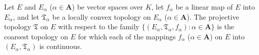 Let $E$ and $E_\alpha$ ($\alpha \in \mathbf{A}$) be vector spaces over $K$, let $f_\alpha$ be a linear map of $E$ into $E_\alpha$, and let $\mathfrak{T}_\alpha$ be a locally convex topology on $E_\alpha$ ($\alpha \in \mathbf{A}$). The projective topology $\mathfrak{T}$ on $E$ with respect to the family $\{(E_\alpha, \mathfrak{T}_\alpha, f_\alpha): \alpha \in \mathbf{A}\}$ is the coarsest topology on $E$ for which each of the mappings $f_\alpha$ ($\alpha \in \mathbf{A}$) on $E$ into $(E_\alpha, \mathfrak{T}_\alpha)$ is continuous.

